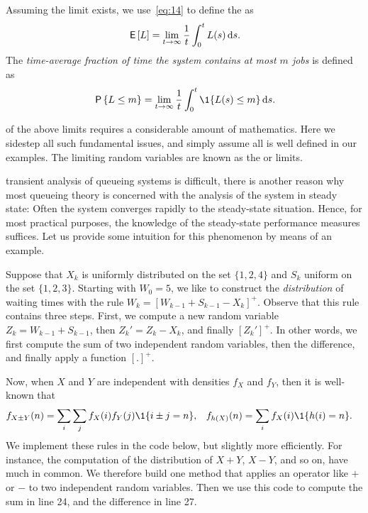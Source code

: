Assuming the limit exists, we use~\cref{eq:14} to define the  as
\begin{equation} \label{eq:46}
 \,\mathsf{E}\left[L\right] = \lim_{t\to\infty} \frac 1 t\int_0^t L(s) \,\textrm{d}s.
\end{equation}
 The \emph{time-average fraction of time the system contains at most $m$ jobs} is defined as
\begin{equation*}
 \P{\L\leq m} =\lim_{t\to\infty} \frac 1 t\int_0^t \1{\L(s)\leq m} \d s.
\end{equation*}

 of the above limits requires a considerable amount of mathematics.
Here we sidestep all such fundamental issues, and simply assume all is well defined in our examples.
The limiting random variables are known as the  or  limits.

 transient analysis of queueing systems is difficult, there is another reason why most queueing theory is concerned with the analysis of the system in steady state: Often the system converges rapidly to the steady-state situation.
Hence, for most practical purposes, the knowledge of the steady-state performance measures suffices.
Let us provide some intuition for this phenomenon by means of an example.


Suppose that $X_k$ is uniformly distributed on the set $\{1,2,4\}$ and $S_k$ uniform on the set $\{1,2,3\}$.
Starting with $W_{0}=5$, we like to construct the \emph{distribution} of waiting times with the rule $W_{k}=[W_{k-1}+S_{k-1}-X_k]^+$.
Observe that this rule contains three steps.
First, we compute a new random variable $Z_k = W_{k-1} + S_{k-1}$, then  $Z_k' = Z_k - X_k$, and finally $[Z_k']^+$.
In other words, we first compute the sum of two independent random variables, then the difference, and finally apply a function $[.]^+$.

Now, when $X$ and $Y$ are independent with densities $f_X$ and $f_Y$, then it is well-known that
\begin{align*}
f_{X\pm Y}(n) &= \sum_i \sum_j f_X(i) f_Y(j)\1{i\pm j = n}, & f_{h(X)}(n) &= \sum_{i} f_X(i)\1{h(i)=n}.
\end{align*}
We implement these rules in the code below, but slightly more efficiently.
For instance, the computation of the distribution of $X+Y$, $X-Y$, and so on, have much in common.
We therefore build one method  that applies an operator like $+$ or $-$ to two independent random variables.
Then we use this code to compute the sum in line 24, and the difference in line 27.


